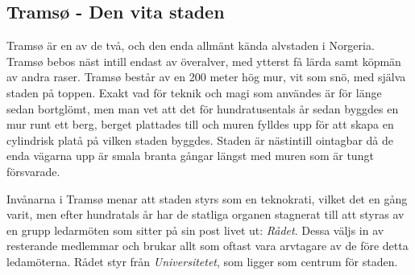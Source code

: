 \subsection{Tramsø - Den vita staden}
%
Tramsø är en av de två, och den enda allmänt kända alvstaden i Norgeria. Tramsø bebos näst intill endast av överalver, med ytterst få lärda samt köpmän av andra raser. Tramsø består av en 200 meter hög mur, vit som snö, med själva staden på toppen. Exakt vad för teknik och magi som användes är för länge sedan bortglömt, men man vet att det för hundratusentals år sedan byggdes en mur runt ett berg, berget plattades till och muren fylldes upp för att skapa en cylindrisk platå på vilken staden byggdes. Staden är nästintill ointagbar då de enda vägarna upp är smala branta gångar längst med muren som är tungt försvarade.

Invånarna i Tramsø menar att staden styrs som en teknokrati, vilket det en gång varit, men efter hundratals år har de statliga organen stagnerat till att styras av en grupp ledarmöten som sitter på sin post livet ut: \textit{Rådet}. Dessa väljs in av resterande medlemmar och brukar allt som oftast vara arvtagare av de före detta ledamöterna. Rådet styr från \textit{Universitetet}, som ligger som centrum för staden.

